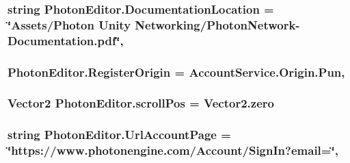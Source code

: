 \subsubsection[{\texorpdfstring{Documentation\+Location}{DocumentationLocation}}]{\setlength{\rightskip}{0pt plus 5cm}string Photon\+Editor.\+Documentation\+Location = \char`\"{}Assets/Photon Unity Networking/{\bf Photon\+Network}-\/Documentation.\+pdf\char`\"{}\hspace{0.3cm}{\ttfamily [static]}, {\ttfamily [protected]}}\hypertarget{class_photon_editor_adf8ddba59d3bddf3e49b891d472b9dd2}{}\label{class_photon_editor_adf8ddba59d3bddf3e49b891d472b9dd2}
\subsubsection[{\texorpdfstring{Register\+Origin}{RegisterOrigin}}]{ Photon\+Editor.\+Register\+Origin = {\bf Account\+Service.\+Origin.\+Pun}\hspace{0.3cm}{\ttfamily [static]}, {\ttfamily [protected]}}\hypertarget{class_photon_editor_a4882839f9ba412f6eeefa90eb4d190e3}{}\label{class_photon_editor_a4882839f9ba412f6eeefa90eb4d190e3}
\subsubsection[{\texorpdfstring{scroll\+Pos}{scrollPos}}]{\setlength{\rightskip}{0pt plus 5cm}Vector2 Photon\+Editor.\+scroll\+Pos = Vector2.\+zero\hspace{0.3cm}{\ttfamily [protected]}}\hypertarget{class_photon_editor_a5229df5b774975987fb48246d81e37aa}{}\label{class_photon_editor_a5229df5b774975987fb48246d81e37aa}
\subsubsection[{\texorpdfstring{Url\+Account\+Page}{UrlAccountPage}}]{\setlength{\rightskip}{0pt plus 5cm}string Photon\+Editor.\+Url\+Account\+Page = \char`\"{}https\+://www.\+photonengine.\+com/Account/Sign\+In?email=\char`\"{}\hspace{0.3cm}{\ttfamily [static]}, {\ttfamily [protected]}}\hypertarget{class_photon_editor_a8fd6815b3b00bbc9aa02db0d68b78008}{}\label{class_photon_editor_a8fd6815b3b00bbc9aa02db0d68b78008}
